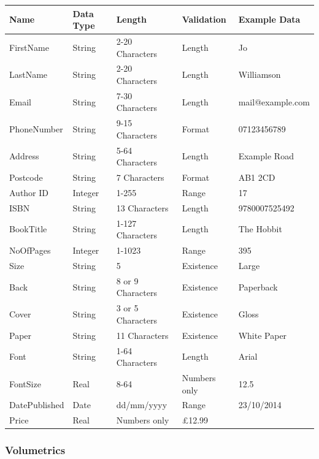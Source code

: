 \begin{center}
\begin{tabular}{|p{2.5cm}|p{1.5cm}|p{2.5cm}|p{2.5cm}|p{3.5cm}|}
    \hline
    \textbf{Name} & \textbf{Data Type} & \textbf{Length} & \textbf{Validation} & \textbf{Example Data} \\ \hline
    FirstName & String & 2-20 Characters & Length & Jo  \\ \hline
    LastName & String & 2-20 Characters & Length & Williamson  \\ \hline
    Email & String & 7-30 Characters & Length & mail@example.com  \\ \hline
    PhoneNumber & String & 9-15 Characters & Format & 07123456789  \\ \hline
    Address & String & 5-64 Characters & Length & Example Road  \\ \hline
    Postcode & String & 7 Characters & Format & AB1 2CD  \\ \hline
    Author ID & Integer & 1-255 & Range & 17  \\ \hline
    ISBN & String & 13 Characters & Length & 9780007525492 \\ \hline
    BookTitle & String & 1-127 Characters & Length & The Hobbit  \\ \hline
    NoOfPages & Integer & 1-1023 & Range & 395  \\ \hline
    Size & String & 5 & Existence & Large \\ \hline
    Back & String & 8 or 9 Characters& Existence & Paperback  \\ \hline
    Cover & String & 3 or 5 Characters & Existence & Gloss \\ \hline
    Paper & String & 11 Characters & Existence & White Paper\\ \hline
    Font & String & 1-64 Characters & Length & Arial  \\ \hline
    FontSize & Real & 8-64 & Numbers only & 12.5  \\ \hline
    DatePublished & Date & dd/mm/yyyy & Range & 23/10/2014 \\ \hline
    Price & Real & Numbers only & £12.99 \\ \hline
    \hline
\end{tabular}
\end{center}

\subsubsection{Volumetrics}

